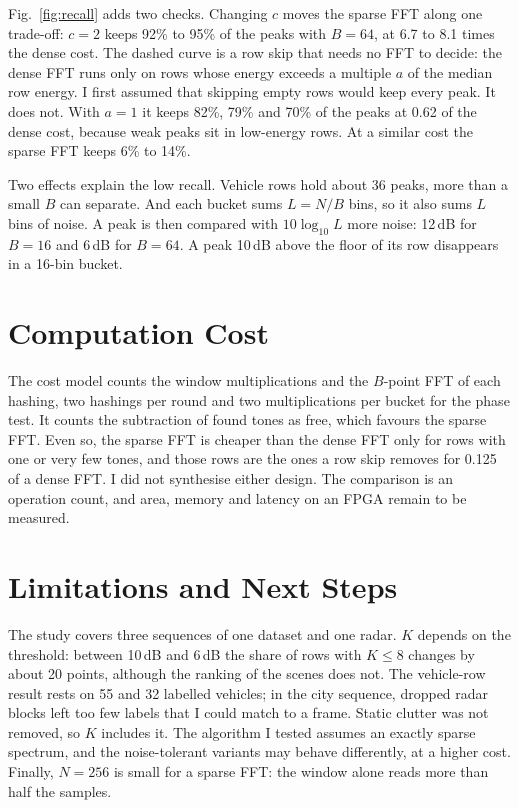 \documentclass[conference]{IEEEtran}
\begin{document}
Fig.~\ref{fig:recall} adds two checks. Changing $c$ moves the sparse FFT along one trade-off: $c = 2$ keeps 92\% to 95\% of the peaks with $B = 64$, at 6.7 to 8.1 times the dense cost. The dashed curve is a row skip that needs no FFT to decide: the dense FFT runs only on rows whose energy exceeds a multiple $a$ of the median row energy. I first assumed that skipping empty rows would keep every peak. It does not. With $a = 1$ it keeps 82\%, 79\% and 70\% of the peaks at 0.62 of the dense cost, because weak peaks sit in low-energy rows. At a similar cost the sparse FFT keeps 6\% to 14\%.

Two effects explain the low recall. Vehicle rows hold about 36 peaks, more than a small $B$ can separate. And each bucket sums $L = N/B$ bins, so it also sums $L$ bins of noise. A peak is then compared with $10\log_{10} L$ more noise: 12\,dB for $B = 16$ and 6\,dB for $B = 64$. A peak 10\,dB above the floor of its row disappears in a 16-bin bucket.

\section{Computation Cost}
The cost model counts the window multiplications and the $B$-point FFT of each hashing, two hashings per round and two multiplications per bucket for the phase test. It counts the subtraction of found tones as free, which favours the sparse FFT. Even so, the sparse FFT is cheaper than the dense FFT only for rows with one or very few tones, and those rows are the ones a row skip removes for 0.125 of a dense FFT. I did not synthesise either design. The comparison is an operation count, and area, memory and latency on an FPGA remain to be measured.

\section{Limitations and Next Steps}
The study covers three sequences of one dataset and one radar. $K$ depends on the threshold: between 10\,dB and 6\,dB the share of rows with $K \le 8$ changes by about 20 points, although the ranking of the scenes does not. The vehicle-row result rests on 55 and 32 labelled vehicles; in the city sequence, dropped radar blocks left too few labels that I could match to a frame. Static clutter was not removed, so $K$ includes it. The algorithm I tested assumes an exactly sparse spectrum, and the noise-tolerant variants \cite{hassanieh2012nearly,hassanieh2012simple} may behave differently, at a higher cost. Finally, $N = 256$ is small for a sparse FFT: the window alone reads more than half the samples.
\end{document}

